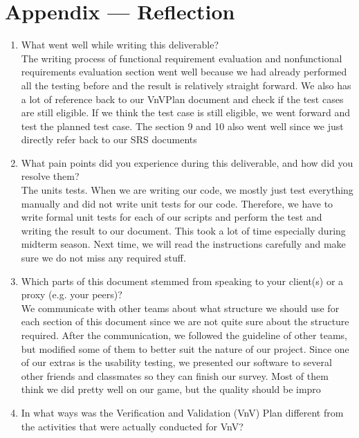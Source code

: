 \documentclass[12pt, titlepage]{article}
\begin{document}
\newpage{}





\section*{Appendix --- Reflection}

\begin{enumerate}
  \item What went well while writing this deliverable?\\
  The writing process of functional requirement evaluation and nonfunctional requirements evaluation section went well because we had already performed all the testing before and the result is relatively straight forward. We also has a lot of reference back to our VnVPlan document and check if the test cases are still eligible. If we think the test case is still eligible, we went forward and test the planned test case. The section 9 and 10 also went well since we just directly refer back to our SRS documents
  \item What pain points did you experience during this deliverable, and how did you resolve them?\\
  The units tests. When we are writing our code, we mostly just test everything manually and did not write unit tests for our code. Therefore, we have to write formal unit tests for each of our scripts and perform the test and writing the result to our document. This took a lot of time especially during midterm season. Next time, we will read the instructions carefully and make sure we do not miss any required stuff.
  \item Which parts of this document stemmed from speaking to your client(s) or a proxy (e.g. your peers)?\\
  We communicate with other teams about what structure we should use for each section of this document since we are not quite sure about the structure required. After the communication, we followed the guideline of other teams, but modified some of them to better suit the nature of our project. Since one of our extras is the usability testing, we presented our software to several other friends and classmates so they can finish our survey. Most of them think we did pretty well on our game, but the quality should be impro
  \item In what ways was the Verification and Validation (VnV) Plan different from the activities that were actually conducted for VnV?
\end{enumerate}
\end{document}
